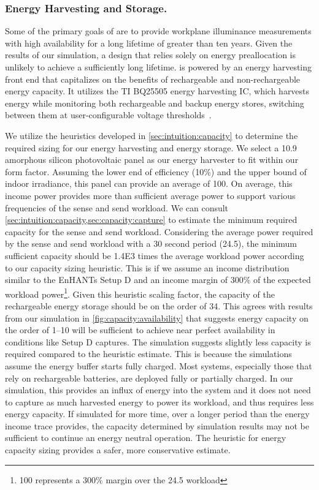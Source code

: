 \subsubsection{Energy Harvesting and Storage.}
Some of the primary goals of \name are to provide workplane illuminance measurements with high availability for a long lifetime of greater than ten years. 
Given the results of our simulation, a design that relies solely on energy preallocation is unlikely to achieve a sufficiently long lifetime. 
\name is powered by an energy harvesting front end that capitalizes on the benefits
of rechargeable and non-rechargeable energy capacity. 
It utilizes the TI BQ25505 energy harvesting IC, which
harvests energy while monitoring both
rechargeable and backup energy stores,
switching between them at user-configurable voltage thresholds~\cite{bq25505}. 

We utilize the heuristics developed in \cref{sec:intuition:capacity} to determine the required sizing for our energy harvesting and energy storage. 
We select a 10.9\ssi{\centi\meter\squared} amorphous
silicon photovoltaic panel as our energy harvester to fit within our form factor.
Assuming the lower end of efficiency (10\%) and the upper bound of indoor irradiance, this panel can provide an average of 100\ssi{\micro\watt}. 
On average, this income power provides more than sufficient average power to support various frequencies of the sense and send workload.
We can consult \cref{sec:intuition:capacity,sec:capacity:capture} to estimate the minimum required capacity for the sense and send workload.
Considering the average power required by the sense and send workload with a 30 second period (24.5\ssi{\micro\watt}), 
the minimum sufficient capacity should be \num{1.4E3} times the average workload power according to our capacity sizing heuristic. 
This is if we assume an income distribution similar to the EnHANTs Setup D and an income margin of 300\% of the expected workload power\footnote{100\ssi{\micro\watt} represents a 300\% margin over the 24.5\ssi{\micro\watt} workload}.
Given this heuristic scaling factor, the capacity of the rechargeable energy storage should be on the order of 34\ssi{\milli\Wh}.
This agrees with results from our simulation in \cref{fig:capacity:availability} that suggests energy capacity on the order of 1--10\ssi{\milli\Wh} will be sufficient to achieve near perfect availability in conditions like Setup D captures.
The simulation suggests slightly less capacity is required compared to the heuristic estimate.
This is because the simulations assume the energy buffer starts fully charged.
Most systems, especially those that rely on rechargeable batteries, are deployed fully or partially charged.
In our simulation, this provides an influx of energy into the system and it does not need to capture as much harvested energy to power its workload, and thus requires less energy capacity.
If simulated for more time, over a longer period than the energy income trace provides, the capacity determined by simulation results may not be sufficient to continue an energy neutral operation.
The heuristic for energy capacity sizing provides a safer, more conservative estimate. 

